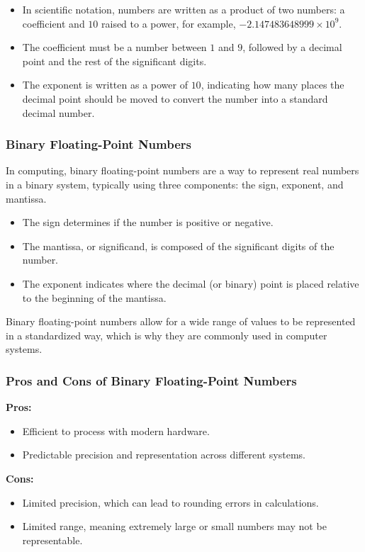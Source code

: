 \documentclass[12pt]{article}
\begin{document}
\begin{itemize}
    \item In scientific notation, numbers are written as a product of two numbers: a coefficient and \(10\) raised to a power, for example, \(-2.147483648999 \times 10^9\).
    \item The coefficient must be a number between \(1\) and \(9\), followed by a decimal point and the rest of the significant digits.
    \item The exponent is written as a power of \(10\), indicating how many places the decimal point should be moved to convert the number into a standard decimal number.
\end{itemize}

\subsubsection{Binary Floating-Point Numbers}
In computing, binary floating-point numbers are a way to represent real numbers in a binary system, typically using three components: the sign, exponent, and mantissa.

\begin{itemize}
    \item The sign determines if the number is positive or negative.
    \item The mantissa, or significand, is composed of the significant digits of the number.
    \item The exponent indicates where the decimal (or binary) point is placed relative to the beginning of the mantissa.
\end{itemize}

Binary floating-point numbers allow for a wide range of values to be represented in a standardized way, which is why they are commonly used in computer systems.


\subsubsection{Pros and Cons of Binary Floating-Point Numbers}
\textbf{Pros:}
\begin{itemize}
    \item Efficient to process with modern hardware.
    \item Predictable precision and representation across different systems.
\end{itemize}

\textbf{Cons:}
\begin{itemize}
    \item Limited precision, which can lead to rounding errors in calculations.
    \item Limited range, meaning extremely large or small numbers may not be representable.
\end{itemize}
\end{document}
